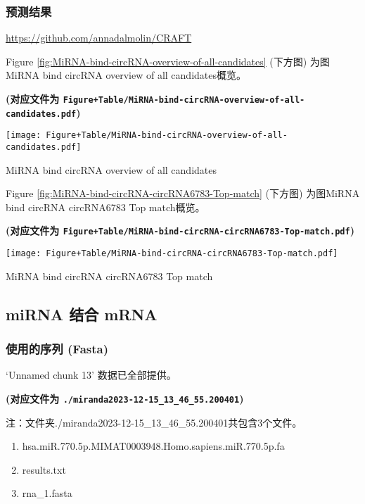 \documentclass[
]{article}
\providecommand{\tightlist}{%
  \setlength{\itemsep}{0pt}\setlength{\parskip}{0pt}}
\begin{document}
\hypertarget{res2}{%
\subsubsection{预测结果}\label{res2}}

\url{https://github.com/annadalmolin/CRAFT}

Figure \ref{fig:MiRNA-bind-circRNA-overview-of-all-candidates} (下方图) 为图MiRNA bind circRNA overview of all candidates概览。

\textbf{(对应文件为 \texttt{Figure+Table/MiRNA-bind-circRNA-overview-of-all-candidates.pdf})}

\def\@captype{figure}
\begin{center}
\texttt{[image: Figure+Table/MiRNA-bind-circRNA-overview-of-all-candidates.pdf]}
\caption{MiRNA bind circRNA overview of all candidates}\label{fig:MiRNA-bind-circRNA-overview-of-all-candidates}
\end{center}

Figure \ref{fig:MiRNA-bind-circRNA-circRNA6783-Top-match} (下方图) 为图MiRNA bind circRNA circRNA6783 Top match概览。

\textbf{(对应文件为 \texttt{Figure+Table/MiRNA-bind-circRNA-circRNA6783-Top-match.pdf})}

\def\@captype{figure}
\begin{center}
\texttt{[image: Figure+Table/MiRNA-bind-circRNA-circRNA6783-Top-match.pdf]}
\caption{MiRNA bind circRNA circRNA6783 Top match}\label{fig:MiRNA-bind-circRNA-circRNA6783-Top-match}
\end{center}

\hypertarget{mirna-ux7ed3ux5408-mrna}{%
\subsection{miRNA 结合 mRNA}\label{mirna-ux7ed3ux5408-mrna}}

\hypertarget{ux4f7fux7528ux7684ux5e8fux5217-fasta-1}{%
\subsubsection{使用的序列 (Fasta)}\label{ux4f7fux7528ux7684ux5e8fux5217-fasta-1}}

`Unnamed chunk 13' 数据已全部提供。

\textbf{(对应文件为 \texttt{./miranda2023-12-15\_13\_46\_55.200401})}

\begin{center}\begin{tcolorbox}[colback=gray!10, colframe=gray!50, width=0.9\linewidth, arc=1mm, boxrule=0.5pt]注：文件夹./miranda2023-12-15\_13\_46\_55.200401共包含3个文件。

\begin{enumerate}\tightlist
\item hsa.miR.770.5p.MIMAT0003948.Homo.sapiens.miR.770.5p.fa
\item results.txt
\item rna\_1.fasta
\end{enumerate}\end{tcolorbox}
\end{center}
\end{document}
